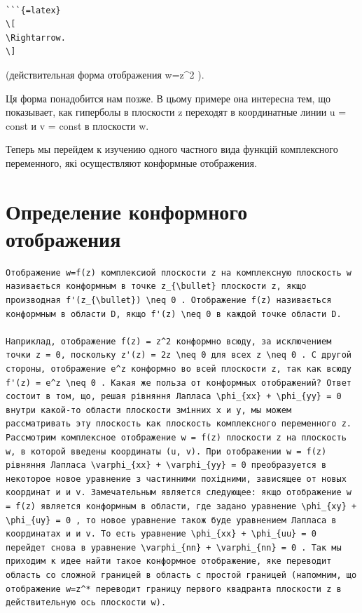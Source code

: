 \documentclass[
]{article}
\begin{document}
\begin{verbatim}

```{=latex}
\[
\Rightarrow.
\]
\end{verbatim}

(действительная форма отображения w=z\^{}2 ).

Ця форма понадобится нам позже. В цьому примере она интересна тем, що
показывает, как гиперболы в плоскости z переходят в координатные линии u
= const и v = const в плоскости w.

Теперь мы перейдем к изучению одного частного вида функцій комплексного
переменного, які осуществляют конформные отображения.

\section{Определение конформного
отображения}\label{ux43eux43fux440ux435ux434ux435ux43bux435ux43dux438ux435-ux43aux43eux43dux444ux43eux440ux43cux43dux43eux433ux43e-ux43eux442ux43eux431ux440ux430ux436ux435ux43dux438ux44f}

\begin{verbatim}
Отображение w=f(z) комплексиой плоскости z на комплексную плоскость w називається конформным в точке z_{\bullet} плоскости z, якщо производная f'(z_{\bullet}) \neq 0 . Отображение f(z) називається конформным в области D, якщо f'(z) \neq 0 в каждой точке области D.

Наприклад, отображение f(z) = z^2 конформно всюду, за исключением точки z = 0, поскольку z'(z) = 2z \neq 0 для всех z \neq 0 . C другой стороны, отображение e^z конформно во всей плоскости z, так как всюду f'(z) = e^z \neq 0 . Какая же польза от конформных отображений? Ответ состоит в том, що, решая рівняння Лапласа \phi_{xx} + \phi_{yy} = 0 внутри какой-то области плоскости змінних x и y, мы можем рассматривать эту плоскость как плоскость комплексного переменного z. Рассмотрим комплексное отображение w = f(z) плоскости z на плоскость w, в которой введены координаты (u, v). При отображении w = f(z) рівняння Лапласа \varphi_{xx} + \varphi_{yy} = 0 преобразуется в некоторое новое уравнение з частинними похідними, зависящее от новых координат и и v. Замечательным является следующее: якщо отображение w = f(z) является конформным в области, где задано уравнение \phi_{xy} + \phi_{uy} = 0 , то новое уравнение також буде уравнением Лапласа в координатах и и v. To есть уравнение \phi_{xx} + \phi_{uu} = 0 перейдет снова в уравнение \varphi_{nn} + \varphi_{nn} = 0 . Так мы приходим к идее найти такое конформное отображение, яке переводит область со сложной границей в область с простой границей (напомним, що отображение w=z^* переводит границу первого квадранта плоскости z в действительную ось плоскости w).
\end{verbatim}
\end{document}

